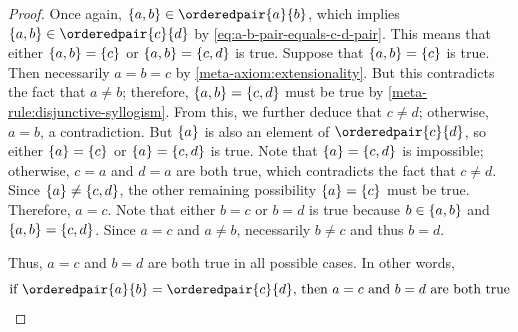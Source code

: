 \begin{proof}
    \vspace{0.1cm}
    \noindent
    Once again, \( \mleft\{ a, b \mright\} \in \orderedpair{a}{b} \), which implies \( \mleft\{ a, b \mright\} \in \orderedpair{c}{d} \) by \eqref{eq:a-b-pair-equals-c-d-pair}.
    This means that either \( \mleft\{ a, b \mright\} = \mleft\{ c \mright\} \) or \( \mleft\{ a, b \mright\} = \mleft\{ c, d \mright\} \) is true.
    Suppose that \( \mleft\{ a, b \mright\} = \mleft\{ c \mright\} \) is true. Then necessarily \( a = b = c \) by \cref{meta-axiom:extensionality}.
    But this contradicts the fact that \( a \neq b \); therefore, \( \mleft\{ a, b \mright\} = \mleft\{ c, d \mright\} \) must be true by
    \cref{meta-rule:disjunctive-syllogism}.
    From this, we further deduce that \( c \neq d \); otherwise, \( a = b \), a contradiction.
    But \( \mleft\{ a \mright\} \) is also an element of \( \orderedpair{c}{d} \), so either \( \mleft\{ a \mright\} = \mleft\{ c \mright\} \) or
    \( \mleft\{ a \mright\} = \mleft\{ c, d \mright\} \) is true. Note that \( \mleft\{ a \mright\} = \mleft\{ c, d \mright\} \) is impossible;
    otherwise, \( c = a \) and \( d = a \) are both true, which contradicts the fact that \( c \neq d \).
    Since \( \mleft\{ a \mright\} \neq \mleft\{ c, d \mright\} \), the other remaining possibility \( \mleft\{ a \mright\} = \mleft\{ c \mright\} \) must be true.
    Therefore, \( a = c \).
    Note that either \( b = c \) or \( b = d \) is true because \( b \in \mleft\{ a, b \mright\} \) and \( \mleft\{ a, b \mright\} = \mleft\{ c, d \mright\} \).
    Since \( a = c \) and \( a \neq b \), necessarily \( b \neq c \) and thus \( b = d \).

    \vspace{0.3cm}
    \noindent
    Thus, \( a = c \) and \( b = d \) are both true in all possible cases. In other words,
    \begin{equation*}
        \text{if \( \orderedpair{a}{b} = \orderedpair{c}{d} \), then \( a = c \) and \( b = d \) are both true}
    \end{equation*}


\end{proof}
